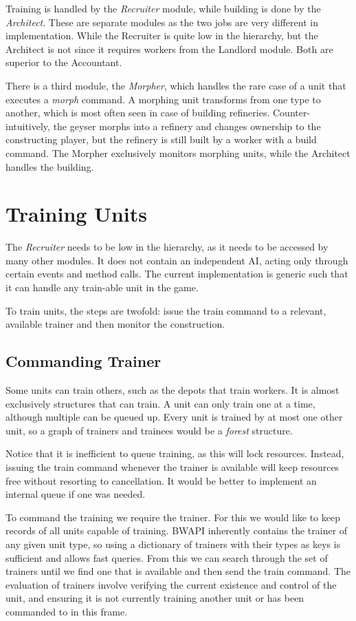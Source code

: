 Training is handled by the \emph{Recruiter} module, while building is done by the \emph{Architect}. These are separate modules as the two jobs are very different in implementation. While the Recruiter is quite low in the hierarchy, but the Architect is not since it requires workers from the Landlord module. Both are superior to the Accountant.

There is a third module, the \emph{Morpher}, which handles the rare case of a unit that executes a \emph{morph} command. A morphing unit transforms from one type to another, which is most often seen in case of building refineries. Counter-intuitively, the geyser morphs into a refinery and changes ownership to the constructing player, but the refinery is still built by a worker with a build command. The Morpher exclusively monitors morphing units, while the Architect handles the building.

\section{Training Units}
The \emph{Recruiter} needs to be low in the hierarchy, as it needs to be accessed by many other modules. It does not contain an independent AI, acting only through certain events and method calls. The current implementation is generic such that it can handle any train-able unit in the game.

To train units, the steps are twofold: issue the train command to a relevant, available trainer and then monitor the construction.

	\subsection*{Commanding Trainer}
	Some units can train others, such as the depots that train workers. It is almost exclusively structures that can train. A unit can only train one at a time, although multiple can be queued up. Every unit is trained by at most one other unit, so a graph of trainers and trainees would be a \emph{forest} structure.
	
	Notice that it is inefficient to queue training, as this will lock resources. Instead, issuing the train command whenever the trainer is available will keep resources free without resorting to cancellation. It would be better to implement an internal queue if one was needed.
	
	To command the training we require the trainer. For this we would like to keep records of all units capable of training. BWAPI inherently contains the trainer of any given unit type, so using a dictionary of trainers with their types as keys is sufficient and allows fast queries. From this we can search through the set of trainers until we find one that is available and then send the train command. The evaluation of trainers involve verifying the current existence and control of the unit, and ensuring it is not currently training another unit or has been commanded to in this frame.
	
